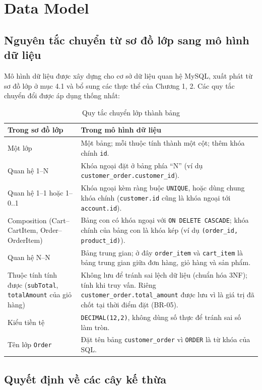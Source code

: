 \documentclass[12pt,a4paper,oneside]{report}
\begin{document}
\section{Data Model}

\subsection{Nguyên tắc chuyển từ sơ đồ lớp sang mô hình dữ liệu}

Mô hình dữ liệu được xây dựng cho cơ sở dữ liệu quan hệ MySQL, xuất phát từ sơ đồ lớp ở mục 4.1 và bổ sung các thực thể của Chương 1, 2. Các quy tắc chuyển đổi được áp dụng thống nhất:

\begin{longtable}{p{4.6cm}p{11.2cm}}
\caption{Quy tắc chuyển lớp thành bảng}\\
\toprule
\textbf{Trong sơ đồ lớp} & \textbf{Trong mô hình dữ liệu} \\
\midrule
\endhead
\bottomrule
\endlastfoot
Một lớp & Một bảng; mỗi thuộc tính thành một cột; thêm khóa chính \texttt{id}. \\
Quan hệ 1--N & Khóa ngoại đặt ở bảng phía ``N'' (ví dụ \texttt{customer\_order.customer\_id}). \\
Quan hệ 1--1 hoặc 1--0..1 & Khóa ngoại kèm ràng buộc \texttt{UNIQUE}, hoặc dùng chung khóa chính (\texttt{customer.id} cũng là khóa ngoại tới \texttt{account.id}). \\
Composition (Cart--CartItem, Order--OrderItem) & Bảng con có khóa ngoại với \texttt{ON DELETE CASCADE}; khóa chính của bảng con là khóa kép (ví dụ \texttt{(order\_id, product\_id)}). \\
Quan hệ N--N & Bảng trung gian; ở đây \texttt{order\_item} và \texttt{cart\_item} là bảng trung gian giữa đơn hàng, giỏ hàng và sản phẩm. \\
Thuộc tính tính được (\texttt{subTotal}, \texttt{totalAmount} của giỏ hàng) & Không lưu để tránh sai lệch dữ liệu (chuẩn hóa 3NF); tính khi truy vấn. Riêng \texttt{customer\_order.total\_amount} được lưu vì là giá trị đã chốt tại thời điểm đặt (BR-05). \\
Kiểu tiền tệ & \texttt{DECIMAL(12,2)}, không dùng số thực để tránh sai số làm tròn. \\
Tên lớp \texttt{Order} & Đặt tên bảng \texttt{customer\_order} vì \texttt{ORDER} là từ khóa của SQL. \\
\end{longtable}

\subsection{Quyết định về các cây kế thừa}
\end{document}
